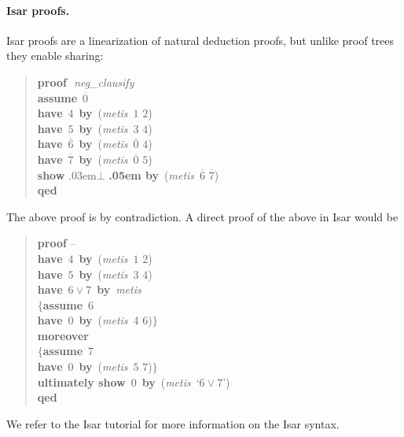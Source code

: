 \documentclass[withtimes,a4paper,12pt]{easychair}
\newcommand\keyw[1]{\textsf{\textbf{#1}}}
\let\B=\overline
\begin{document}
\paragraph{Isar proofs.} Isar proofs are a linearization of natural deduction
proofs, but unlike proof trees they enable sharing:
%
\begin{quote}
\keyw{proof}\,~\textit{neg\_clausify} \\
\hbox{}\quad \keyw{assume}\, $\B{0}$ \\
\hbox{}\quad \keyw{have}\, $4$ \keyw{\,by\,} (\textit{metis\, }$1$ $2$) \\
\hbox{}\quad \keyw{have}\, $5$ \keyw{\,by\,} (\textit{metis\, }$3$ $4$) \\
\hbox{}\quad \keyw{have}\, $\B{6}$ \keyw{\,by\,} (\textit{metis\, }$\B{0}$ $4$) \\
\hbox{}\quad \keyw{have}\, $\B{7}$ \keyw{\,by\,} (\textit{metis\, }$\B{0}$ $5$) \\
\hbox{}\quad \keyw{show} \kern.03em$\bot$ \keyw{\kern.05em by\,} (\textit{metis\, }$\B{6}$ $\B{7}$) \\ %
\keyw{qed}
\end{quote}
%
The above proof is by contradiction. A direct proof of the above in Isar would
be
%
\begin{quote}
\keyw{proof} -- \\
\hbox{}\quad \keyw{have}\, $4$ \keyw{\,by\,} (\textit{metis\, }$1$ $2$) \\
\hbox{}\quad \keyw{have}\, $5$ \keyw{\,by\,} (\textit{metis\, }$3$ $4$) \\
\hbox{}\quad \keyw{have}\, $6 \lor 7$ \keyw{\,by\,} \textit{metis} \\
\hbox{}\quad $\{$\quad \keyw{assume}\, $6$ \\
\hbox{}\qquad\phantom{$\{$}\keyw{have}\, $0$ \keyw{\,by\,} (\textit{metis\, }$4$ $6$)\quad$\}$ \\
\hbox{}\quad \keyw{moreover} \\
\hbox{}\quad $\{$\quad \keyw{assume}\, $7$ \\
\hbox{}\qquad\phantom{$\{$}\keyw{have}\, $0$ \keyw{\,by\,} (\textit{metis\, }$5$ $7$)\quad$\}$ \\
\hbox{}\quad \keyw{ultimately show}\, $0$ \keyw{\,by\,} (\textit{metis\, }`$6 \lor 7$') \\
\keyw{qed}
\end{quote}
We refer to the Isar tutorial \cite{nipkow-2011-isar} for more information on
the Isar syntax.
\end{document}
